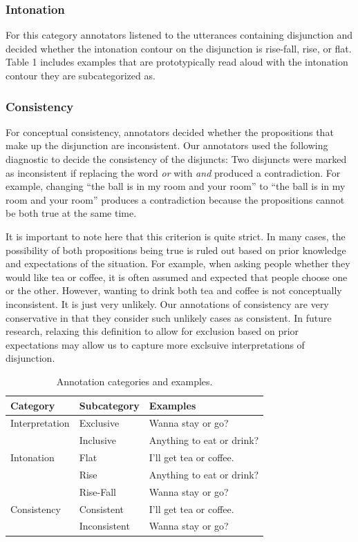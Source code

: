 \documentclass[10pt, letterpaper]{article}
\begin{document}
\subsubsection{Intonation}\label{intonation}

For this category annotators listened to the utterances containing
disjunction and decided whether the intonation contour on the
disjunction is rise-fall, rise, or flat. Table 1 includes examples that
are prototypically read aloud with the intonation contour they are
subcategorized as.

\subsubsection{Consistency}\label{consistency}

For conceptual consistency, annotators decided whether the propositions
that make up the disjunction are inconsistent. Our annotators used the
following diagnostic to decide the consistency of the disjuncts: Two
disjuncts were marked as inconsistent if replacing the word \emph{or}
with \emph{and} produced a contradiction. For example, changing ``the
ball is in my room and your room'' to ``the ball is in my room and your
room'' produces a contradiction because the propositions cannot be both
true at the same time.

It is important to note here that this criterion is quite strict. In
many cases, the possibility of both propositions being true is ruled out
based on prior knowledge and expectations of the situation. For example,
when asking people whether they would like tea or coffee, it is often
assumed and expected that people choose one or the other. However,
wanting to drink both tea and coffee is not conceptually inconsistent.
It is just very unlikely. Our annotations of consistency are very
conservative in that they consider such unlikely cases as consistent. In
future research, relaxing this definition to allow for exclusion based
on prior expectations may allow us to capture more exclsuive
interpretations of disjunction.

\begin{table}[t]
\centering
\begin{tabular}{lll}
 Category & Subcategory & Examples \\ 
  \hline
Interpretation & Exclusive & Wanna stay or go? \\ 
   & Inclusive & Anything to eat or drink? \\ 
   \hline
Intonation & Flat & I'll get tea or coffee. \\ 
   & Rise & Anything to eat or drink? \\ 
   & Rise-Fall & Wanna stay or go? \\ 
   \hline
Consistency & Consistent & I'll get tea or coffee. \\ 
   & Inconsistent & Wanna stay or go? \\ 
  \end{tabular}
\caption{Annotation categories and examples.} 
\end{table}
\end{document}
